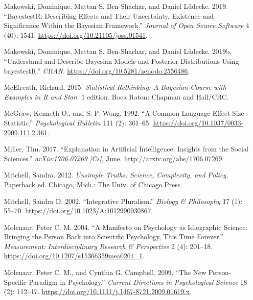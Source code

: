 \documentclass[
]{book}
\newlength{\cslhangindent}
\newenvironment{cslreferences}%
  {\setlength{\parindent}{0pt}%
  \everypar{\setlength{\hangindent}{\cslhangindent}}\ignorespaces}%
  {\par}
\begin{document}
\begin{cslreferences}
\leavevmode\hypertarget{ref-R-bayestestR}{}%
Makowski, Dominique, Mattan S. Ben-Shachar, and Daniel Lüdecke. 2019. ``BayestestR: Describing Effects and Their Uncertainty, Existence and Significance Within the Bayesian Framework.'' \emph{Journal of Open Source Software} 4 (40): 1541. \url{https://doi.org/10.21105/joss.01541}.

\leavevmode\hypertarget{ref-makowskiUnderstandDescribeBayesian2019}{}%
Makowski, Dominique, Mattan S. Ben-Shachar, and Daniel Lüdecke. 2019b. ``Understand and Describe Bayesian Models and Posterior Distributions Using bayestestR.'' \emph{CRAN}. \url{https://doi.org/10.5281/zenodo.2556486}.

\leavevmode\hypertarget{ref-mcelreathStatisticalRethinkingBayesian2015}{}%
McElreath, Richard. 2015. \emph{Statistical Rethinking: A Bayesian Course with Examples in R and Stan}. 1 edition. Boca Raton: Chapman and Hall/CRC.

\leavevmode\hypertarget{ref-mcgrawCommonLanguageEffect1992}{}%
McGraw, Kenneth O., and S. P. Wong. 1992. ``A Common Language Effect Size Statistic.'' \emph{Psychological Bulletin} 111 (2): 361--65. \url{https://doi.org/10.1037/0033-2909.111.2.361}.

\leavevmode\hypertarget{ref-millerExplanationArtificialIntelligence2017}{}%
Miller, Tim. 2017. ``Explanation in Artificial Intelligence: Insights from the Social Sciences.'' \emph{arXiv:1706.07269 {[}Cs{]}}, June. \url{http://arxiv.org/abs/1706.07269}.

\leavevmode\hypertarget{ref-mitchellUnsimpleTruthsScience2012}{}%
Mitchell, Sandra. 2012. \emph{Unsimple Truths: Science, Complexity, and Policy}. Paperback ed. Chicago, Mich.: The Univ. of Chicago Press.

\leavevmode\hypertarget{ref-mitchellIntegrativePluralism2002}{}%
Mitchell, Sandra D. 2002. ``Integrative Pluralism.'' \emph{Biology \& Philosophy} 17 (1): 55--70. \url{https://doi.org/10.1023/A:1012990030867}.

\leavevmode\hypertarget{ref-molenaarManifestoPsychologyIdiographic2004}{}%
Molenaar, Peter C. M. 2004. ``A Manifesto on Psychology as Idiographic Science: Bringing the Person Back into Scientific Psychology, This Time Forever.'' \emph{Measurement: Interdisciplinary Research \& Perspective} 2 (4): 201--18. \url{https://doi.org/10.1207/s15366359mea0204_1}.

\leavevmode\hypertarget{ref-molenaarNewPersonSpecificParadigm2009}{}%
Molenaar, Peter C. M., and Cynthia G. Campbell. 2009. ``The New Person-Specific Paradigm in Psychology.'' \emph{Current Directions in Psychological Science} 18 (2): 112--17. \url{https://doi.org/10.1111/j.1467-8721.2009.01619.x}.


\end{cslreferences}
\end{document}
